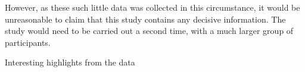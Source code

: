 However, as these such little data was collected in this circumstance, it would be unreasonable to claim that this study contains any decisive information. The study would need to be carried out a second time, with a much larger group of participants.

Interesting highlights from the data 
